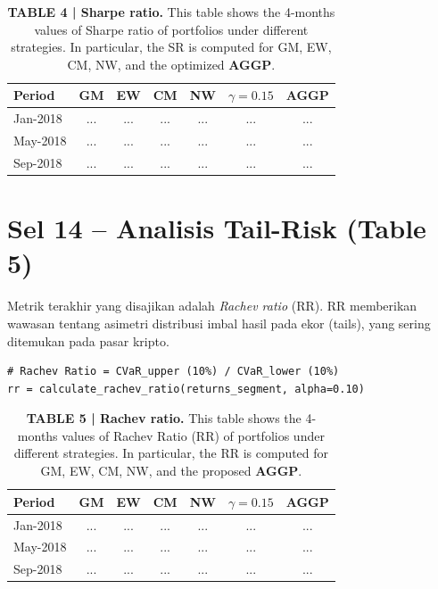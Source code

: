 \documentclass[12pt,a4paper]{article}
\begin{document}
\begin{table}[h]
    \centering
    \footnotesize
    \caption{\textbf{TABLE 4 | Sharpe ratio.} This table shows the 4-months values of Sharpe ratio of portfolios under different strategies. In particular, the SR is computed for GM, EW, CM, NW, and the optimized \textbf{AGGP}.}
    \begin{tabular}{lcccccc}
        \toprule
        Period & GM & EW & CM & NW & $\gamma=0.15$ & AGGP \\
        \midrule
        Jan-2018 & ... & ... & ... & ... & ... & ... \\
        May-2018 & ... & ... & ... & ... & ... & ... \\
        Sep-2018 & ... & ... & ... & ... & ... & ... \\
        \bottomrule
    \end{tabular}
\end{table}

\section{Sel 14 -- Analisis Tail-Risk (Table 5)}
Metrik terakhir yang disajikan adalah \textit{Rachev ratio} (RR). RR memberikan wawasan tentang asimetri distribusi imbal hasil pada ekor (tails), yang sering ditemukan pada pasar kripto.

\begin{lstlisting}[caption={Kalkulasi Rachev Ratio Periodik}]
# Rachev Ratio = CVaR_upper (10%) / CVaR_lower (10%)
rr = calculate_rachev_ratio(returns_segment, alpha=0.10)
\end{lstlisting}

\begin{table}[h]
    \centering
    \footnotesize
    \caption{\textbf{TABLE 5 | Rachev ratio.} This table shows the 4-months values of Rachev Ratio (RR) of portfolios under different strategies. In particular, the RR is computed for GM, EW, CM, NW, and the proposed \textbf{AGGP}.}
    \begin{tabular}{lcccccc}
        \toprule
        Period & GM & EW & CM & NW & $\gamma=0.15$ & AGGP \\
        \midrule
        Jan-2018 & ... & ... & ... & ... & ... & ... \\
        May-2018 & ... & ... & ... & ... & ... & ... \\
        Sep-2018 & ... & ... & ... & ... & ... & ... \\
        \bottomrule
    \end{tabular}
\end{table}
\end{document}
